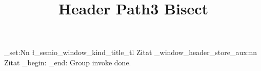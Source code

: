 \documentclass[type=zwischenbericht]{zukunftbau}
\title{Header Path3 Bisect}
\begin{document}
\ExplSyntaxOn
\tl_set:Nn \l_semio_window_kind_title_tl { Zitat }
\semio_window_header_store_aux:nn { } { Zitat }
\group_begin:
\ExplSyntaxOff
\makeatletter
\semio@window@header@invoke
\makeatother
\group_end:
\ExplSyntaxOff
Group invoke done.
\end{document}
